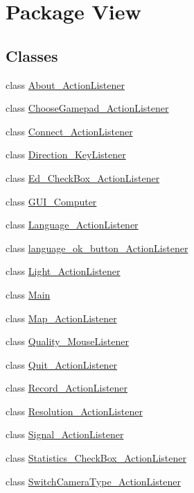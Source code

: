 \hypertarget{namespace_view}{}\section{Package View}
\label{namespace_view}
\subsection*{Classes}
\begin{DoxyCompactItemize}
\item 
class \hyperlink{class_view_1_1_about___action_listener}{About\+\_\+\+Action\+Listener}
\item 
class \hyperlink{class_view_1_1_choose_gamepad___action_listener}{Choose\+Gamepad\+\_\+\+Action\+Listener}
\item 
class \hyperlink{class_view_1_1_connect___action_listener}{Connect\+\_\+\+Action\+Listener}
\item 
class \hyperlink{class_view_1_1_direction___key_listener}{Direction\+\_\+\+Key\+Listener}
\item 
class \hyperlink{class_view_1_1_ed___check_box___action_listener}{Ed\+\_\+\+Check\+Box\+\_\+\+Action\+Listener}
\item 
class \hyperlink{class_view_1_1_g_u_i___computer}{G\+U\+I\+\_\+\+Computer}
\item 
class \hyperlink{class_view_1_1_language___action_listener}{Language\+\_\+\+Action\+Listener}
\item 
class \hyperlink{class_view_1_1language__ok__button___action_listener}{language\+\_\+ok\+\_\+button\+\_\+\+Action\+Listener}
\item 
class \hyperlink{class_view_1_1_light___action_listener}{Light\+\_\+\+Action\+Listener}
\item 
class \hyperlink{class_view_1_1_main}{Main}
\item 
class \hyperlink{class_view_1_1_map___action_listener}{Map\+\_\+\+Action\+Listener}
\item 
class \hyperlink{class_view_1_1_quality___mouse_listener}{Quality\+\_\+\+Mouse\+Listener}
\item 
class \hyperlink{class_view_1_1_quit___action_listener}{Quit\+\_\+\+Action\+Listener}
\item 
class \hyperlink{class_view_1_1_record___action_listener}{Record\+\_\+\+Action\+Listener}
\item 
class \hyperlink{class_view_1_1_resolution___action_listener}{Resolution\+\_\+\+Action\+Listener}
\item 
class \hyperlink{class_view_1_1_signal___action_listener}{Signal\+\_\+\+Action\+Listener}
\item 
class \hyperlink{class_view_1_1_statistics___check_box___action_listener}{Statistics\+\_\+\+Check\+Box\+\_\+\+Action\+Listener}
\item 
class \hyperlink{class_view_1_1_switch_camera_type___action_listener}{Switch\+Camera\+Type\+\_\+\+Action\+Listener}
\end{DoxyCompactItemize}
